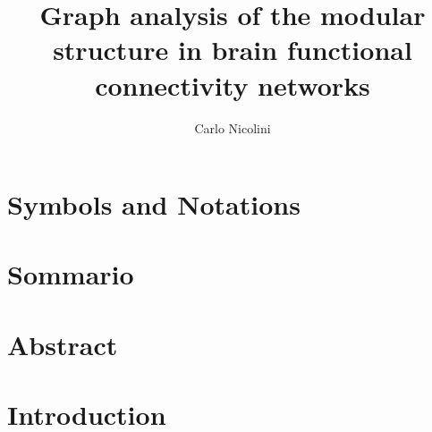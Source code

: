 
%

\title{Graph analysis of the modular structure in brain functional connectivity networks}
\author{Carlo Nicolini}


\newtheorem{obs}{Observation}
\newtheorem{props}{Proposition}
\newenvironment{bottompar}{\par\vspace*{\fill}}{\clearpage}



\afterpage{\blankpage}

{}

\tableofcontents

%

\chapter*{Symbols and Notations}


% 
\chapter*{Sommario}



\chapter*{Abstract}


\chapter{Introduction}\label{chap:introduction}


